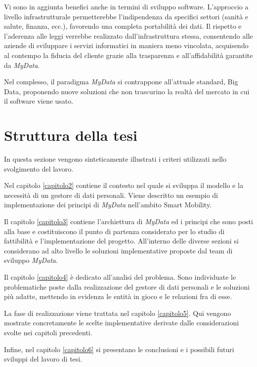 Vi sono in aggiunta benefici anche in termini di sviluppo software. L’approccio a livello infrastrutturale permetterebbe l’indipendenza da specifici settori (sanit\`a e salute, finanza, ecc.), favorendo una completa portabilit\`a dei dati. Il rispetto e l’aderenza alle leggi verrebbe realizzato dall’infrastruttura stessa, consentendo alle aziende di sviluppare i servizi informatici in maniera meno vincolata, acquisendo al contempo la fiducia del cliente grazie alla trasparenza e all’affidabilit\`a garantite da \textit{MyData}.

Nel complesso, il paradigma \textit{MyData} si contrappone all’attuale standard, Big Data, proponendo nuove soluzioni che non trascurino la realt\`a del mercato in cui il software viene usato.

\section{Struttura della tesi}

In questa sezione vengono sinteticamente illustrati i criteri utilizzati nello svolgimento del lavoro.

Nel capitolo \ref{capitolo2} contiene il contesto nel quale si sviluppa il modello e la necessit\`a di un gestore di dati personali. Viene descritto un esempio di implementazione dei principi di \textit{MyData} nell'ambito Smart Mobility.

Il capitolo \ref{capitolo3} contiene l'archiettura di \textit{MyData} ed i principi che sono posti alla base e costituiscono il punto di partenza considerato per lo studio di fattibilit\`a e l'implementazione del progetto. All'interno delle diverse sezioni si considerano ad alto livello le soluzioni implementative proposte dal team di sviluppo \textit{MyData}.

Il capitolo \ref{capitolo4} \`e dedicato all'analisi del problema. Sono individuate le problematiche poste dalla realizzazione del gestore di dati personali e le soluzioni pi\`u adatte, mettendo in evidenza le entit\`a in gioco e le relazioni fra di esse.

La fase di realizzazione viene trattata nel capitolo \ref{capitolo5}. Qui vengono mostrate concretamente le scelte implementative derivate dalle considerazioni svolte nei capitoli precedenti.

Infine, nel capitolo \ref{capitolo6} si presentano le conclusioni e i possibili futuri sviluppi del lavoro di tesi.

